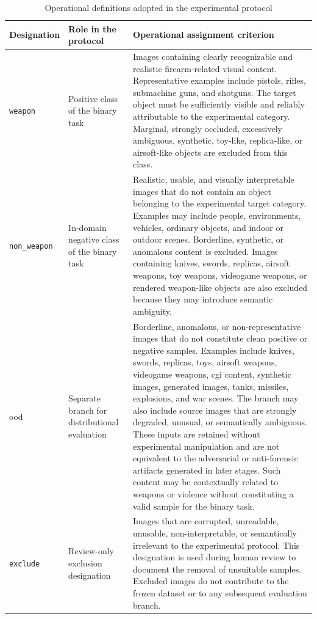 \begin{table}[H]
\centering
\caption{Operational definitions adopted in the experimental protocol}
\label{tab:methodology-operational-classes}
\footnotesize
\renewcommand{\arraystretch}{1.05}
\begin{tabularx}{\textwidth}{@{}L{3.0cm}L{3.6cm}X@{}}
\toprule
\textbf{Designation} &
\textbf{Role in the protocol} &
\textbf{Operational assignment criterion} \\
\midrule

\texttt{weapon}
&
Positive class of the binary task
&
Images containing clearly recognizable and realistic firearm-related visual
content. Representative examples include pistols, rifles, submachine guns, and
shotguns. The target object must be sufficiently visible and reliably
attributable to the experimental category. Marginal, strongly occluded,
excessively ambiguous, synthetic, toy-like, replica-like, or airsoft-like
objects are excluded from this class. \\

\texttt{non\_weapon}
&
In-domain negative class of the binary task
&
Realistic, usable, and visually interpretable images that do not contain an
object belonging to the experimental target category. Examples may include
people, environments, vehicles, ordinary objects, and indoor or outdoor scenes.
Borderline, synthetic, or anomalous content is excluded. Images containing
knives, swords, replicas, airsoft weapons, toy weapons, videogame weapons, or
rendered weapon-like objects are also excluded because they may introduce
semantic ambiguity. \\

\gls{ood}
&
Separate branch for distributional evaluation
&
Borderline, anomalous, or non-representative images that do not constitute clean
positive or negative samples. Examples include knives, swords, replicas, toys,
airsoft weapons, videogame weapons, \gls{cgi} content, synthetic images,
generated images, tanks, missiles, explosions, and war scenes. The branch may
also include source images that are strongly degraded, unusual, or semantically
ambiguous. These inputs are retained without experimental manipulation and are
not equivalent to the adversarial or anti-forensic artifacts generated in later
stages. Such content may be contextually related to weapons or violence without
constituting a valid sample for the binary task. \\

\texttt{exclude}
&
Review-only exclusion designation
&
Images that are corrupted, unreadable, unusable, non-interpretable, or
semantically irrelevant to the experimental protocol. This designation is used
during human review to document the removal of unsuitable samples. Excluded
images do not contribute to the frozen dataset or to any subsequent evaluation
branch. \\

\bottomrule
\end{tabularx}
\end{table}

